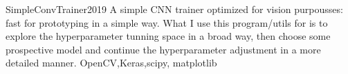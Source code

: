%
%
%


\begin{projects}				
	\project
	{SimpleConvTrainer}{2019}
	{}
	{A simple CNN trainer optimized for vision purpousses: fast for prototyping in a simple way.
	What I use this program/utils for is to explore the hyperparameter tunning space in a broad way,
	then choose some prospective model and continue the hyperparameter adjustment in a more detailed manner.}
	{OpenCV,Keras,scipy, matplotlib}

\end{projects}